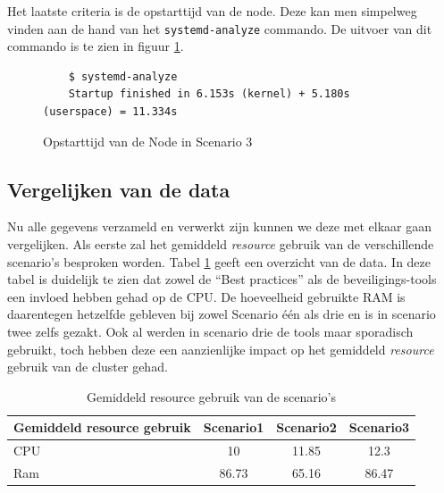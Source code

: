 Het laatste criteria is de opstarttijd van de node. Deze kan men simpelweg vinden aan de hand van het \verb|systemd-analyze| commando. De uitvoer van dit commando is te zien in figuur \ref{SC3_StartTime}.

\begin{figure}[h]
	\centering
	\begin{verbatim} 
	$ systemd-analyze
	Startup finished in 6.153s (kernel) + 5.180s (userspace) = 11.334s
	\end{verbatim}
	\caption{Opstarttijd van de Node in Scenario 3}
	\label{SC3_StartTime}
\end{figure}

\clearpage
\subsection{Vergelijken van de data}
Nu alle gegevens verzameld en verwerkt zijn kunnen we deze met elkaar gaan vergelijken. Als eerste zal het gemiddeld \textit{resource} gebruik van de verschillende scenario's besproken worden. Tabel \ref{tab:AVGResource} geeft een overzicht van de data. In deze tabel is duidelijk te zien dat zowel de ``Best practices'' als de beveiligings-tools een invloed hebben gehad op de CPU. De hoeveelheid gebruikte RAM is daarentegen hetzelfde gebleven bij zowel Scenario één als drie en is in scenario twee zelfs gezakt. Ook al werden in scenario drie de tools maar sporadisch gebruikt, toch hebben deze een aanzienlijke impact op het gemiddeld \textit{resource} gebruik van de cluster gehad. 
\begin{table}[h]
	\centering
	\begin{tabular}{lccc}
		Gemiddeld resource gebruik & Scenario1 & Scenario2 & Scenario3 \\ \hline
		CPU                        & 10        & 11.85        & 12.3      \\ \hline
		Ram                        & 86.73     & 65.16        & 86.47    
	\end{tabular}
	\caption{Gemiddeld resource gebruik van de scenario's}
	\label{tab:AVGResource}
\end{table}

